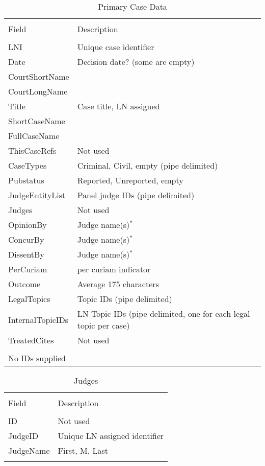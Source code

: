 \documentclass[10pt, letterpaper]{article}
\begin{document}
\begin{spacing}{1.0}
\begin{table}[h!]
    \centering
    \caption{Primary Case Data}
    \begin{tabular}{ll}
        \hline\\[-8pt]
        Field & Description\\[2pt]
        \hline\\[-6pt]
        LNI & Unique case identifier\\
        Date & Decision date? (some are empty)\\
        CourtShortName & \\
        CourtLongName & \\
        Title & Case title, LN assigned \\
        ShortCaseName & \\
        FullCaseName & \\
        ThisCaseRefs & Not used \\
        CaseTypes & Criminal, Civil, empty (pipe delimited) \\
        Pubstatus & Reported, Unreported, empty \\
        JudgeEntityList & Panel judge IDs (pipe delimited) \\
        Judges & Not used \\
        OpinionBy & Judge name(s)$^*$ \\
        ConcurBy & Judge name(s)$^*$ \\
        DissentBy & Judge name(s)$^*$ \\
        PerCuriam & per curiam indicator \\
        Outcome & Average 175 characters \\
        LegalTopics & Topic IDs (pipe delimited) \\
        InternalTopicIDs & LN Topic IDs (pipe delimited, one for each legal topic per case) \\
        TreatedCites & Not used \\ [6pt]
        \hline\\[-6pt]
        \small * No IDs supplied
    \end{tabular}
\label{tb:FileDescCaseHeader}
\end{table}
        
\begin{table}[h!]
    \centering
    \caption{Judges}
    \begin{tabular}{ll}
        \hline\\[-8pt]
        Field & Description\\[2pt]
        \hline\\[-6pt]
        ID & Not used \\
        JudgeID & Unique LN assigned identifier \\
        JudgeName & First, M, Last \\[6pt]
        \hline\\[-6pt]
    \end{tabular}
    \label{tb:FileDescJudges}
\end{table}


\end{spacing}
\end{document}
